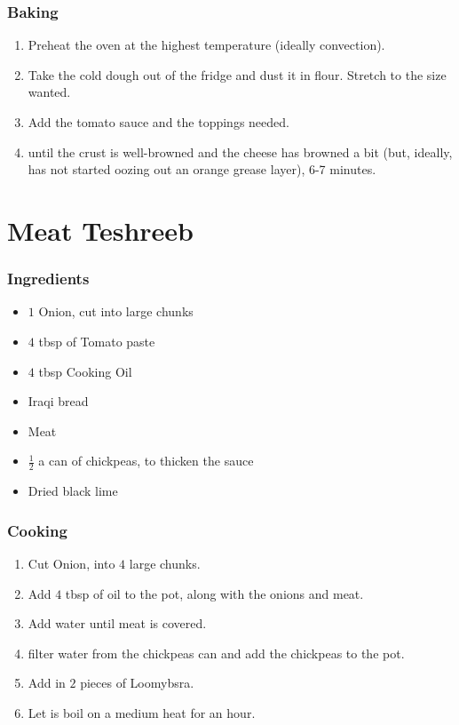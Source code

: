\subsubsection{Baking}
\begin{enumerate}
    \item Preheat the oven at the highest temperature (ideally convection).
    \item Take the cold dough out of the fridge and dust it in flour. Stretch to the size wanted.
    \item Add the tomato sauce and the toppings needed.
    \item until the crust is well-browned and the cheese has browned a bit (but, ideally, has not started oozing out an orange grease layer), 6-7 minutes.
\end{enumerate}

\section{Meat Teshreeb}
\subsubsection{Ingredients}
\begin{itemize}
    \item $1$ Onion, cut into large chunks
    \item $4$ tbsp of Tomato paste
    \item $4$ tbsp Cooking Oil
    \item Iraqi bread
    \item Meat
    \item $\frac{1}{2}$ a can of chickpeas, to thicken the sauce
    \item Dried black lime
\end{itemize}

\subsubsection{Cooking}
\begin{enumerate}
    \item Cut Onion, into $4$ large chunks.
    \item Add $4$ tbsp of oil to the pot, along with the onions and meat.
    \item Add water until meat is covered.
    \item filter water from the chickpeas can and add the chickpeas to the pot.
    \item Add in $2$ pieces of Loomybsra.
    \item Let is boil on a medium heat for an hour.
\end{enumerate}
